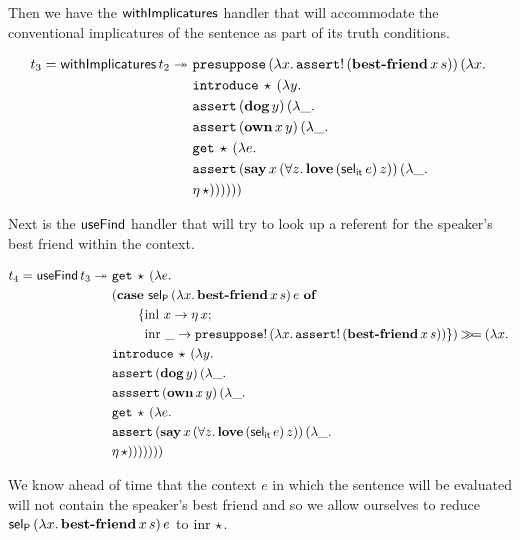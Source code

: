 Then we have the $\mathsf{withImplicatures}$ handler that will accommodate the
conventional implicatures of the sentence as part of its truth conditions.

\begin{align*}
  t_3 = \ap{\withImplicatures}{t_2} \tto \ 
  &\app{\op{presuppose}}{(\lam{x}{\ap{\op{assert}!}{(\app{\obj{best-friend}}{x}{s})}})}{(\lam{x}{ \\
  &\app{\op{introduce}}{\star}{(\lam{y}{ \\
  &\app{\op{assert}}{(\ap{\obj{dog}}{y})}{(\lam{\_}{ \\
  &\app{\op{assert}}{(\app{\obj{own}}{x}{y})}{(\lam{\_}{ \\
  &\app{\op{get}}{\star}{(\lam{e}{ \\
  &\app{\op{assert}}{(\app{\obj{say}}{x}{(\forall z.\, \app{\obj{love}}{(\ap{\selit}{e})}{z})})}{(\lam{\_}{ \\
  &\etaE{\star}})}})}})}})}})}})}
\end{align*}

Next is the $\mathsf{useFind}$ handler that will try to look up a referent for the
speaker's best friend within the context.

\begin{align*}
  t_4 = \mathsf{useFind}\,t_3 \twoheadrightarrow \
  &\mathtt{get}\,\star\,(\lambda e.\,  \\
  &(\text{\textbf{case} $\mathsf{sel}_{\mathsf{P}}\,(\lambda x.\, \textbf{best-friend}\,x\,s)\,e$ \textbf{of}} \\ &\qquad \{\operatorname{inl}\,x \to \eta\,x; \\ &\qquad \ \operatorname{inr}\,\_ \to \mathtt{presuppose}!\,(\lambda x.\, \mathtt{assert}!\,(\textbf{best-friend}\,x\,s)) \}) \mathbin{\gg\!=} (\lambda x.\,  \\
  &\mathtt{introduce}\,\star\,(\lambda y.\,  \\
  &\mathtt{assert}\,(\textbf{dog}\,y)\,(\lambda \_.\,  \\
  &\mathtt{asssert}\,(\textbf{own}\,x\,y)\,(\lambda \_.\,  \\
  &\mathtt{get}\,\star\,(\lambda e.\,  \\
  &\mathtt{assert}\,(\textbf{say}\,x\,(\forall z.\, \textbf{love}\,(\mathsf{sel}_{\mathsf{it}}\,e)\,z))\,(\lambda \_.\,  \\
  &\eta\,\star)))))))
\end{align*}

We know ahead of time that the context $e$ in which the sentence will be
evaluated will not contain the speaker's best friend and so we allow
ourselves to reduce
$\mathsf{sel}_{\mathsf{P}}\,(\lambda x.\, \textbf{best-friend}\,x\,s)\,e$ to
$\operatorname{inr}\,\star$.

